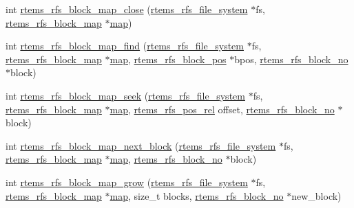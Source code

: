 \begin{DoxyCompactItemize}
\item 
int \mbox{\hyperlink{rtems-rfs-block_8c_a9f3eaf881c5744fcfe5798cea33999a7}{rtems\+\_\+rfs\+\_\+block\+\_\+map\+\_\+close}} (\mbox{\hyperlink{struct__rtems__rfs__file__system}{rtems\+\_\+rfs\+\_\+file\+\_\+system}} $\ast$fs, \mbox{\hyperlink{rtems-rfs-block_8h_af488270acef452a961e888bffdc3a7bf}{rtems\+\_\+rfs\+\_\+block\+\_\+map}} $\ast$\mbox{\hyperlink{struct__map}{map}})
\item 
int \mbox{\hyperlink{rtems-rfs-block_8c_a425d37b16d533475f1c60069eedfa6aa}{rtems\+\_\+rfs\+\_\+block\+\_\+map\+\_\+find}} (\mbox{\hyperlink{struct__rtems__rfs__file__system}{rtems\+\_\+rfs\+\_\+file\+\_\+system}} $\ast$fs, \mbox{\hyperlink{rtems-rfs-block_8h_af488270acef452a961e888bffdc3a7bf}{rtems\+\_\+rfs\+\_\+block\+\_\+map}} $\ast$\mbox{\hyperlink{struct__map}{map}}, \mbox{\hyperlink{rtems-rfs-block-pos_8h_a0d8bd7482333e584a03df45e60cda226}{rtems\+\_\+rfs\+\_\+block\+\_\+pos}} $\ast$bpos, \mbox{\hyperlink{rtems-rfs-block-pos_8h_abbf8bb95acf9bd16ed3291f7da518e9a}{rtems\+\_\+rfs\+\_\+block\+\_\+no}} $\ast$block)
\item 
int \mbox{\hyperlink{rtems-rfs-block_8c_a0bb73241f191cf0f14dee8c309e8d577}{rtems\+\_\+rfs\+\_\+block\+\_\+map\+\_\+seek}} (\mbox{\hyperlink{struct__rtems__rfs__file__system}{rtems\+\_\+rfs\+\_\+file\+\_\+system}} $\ast$fs, \mbox{\hyperlink{rtems-rfs-block_8h_af488270acef452a961e888bffdc3a7bf}{rtems\+\_\+rfs\+\_\+block\+\_\+map}} $\ast$\mbox{\hyperlink{struct__map}{map}}, \mbox{\hyperlink{rtems-rfs-file-system_8h_af6bccb465dcd34c68e9f0c214950ef57}{rtems\+\_\+rfs\+\_\+pos\+\_\+rel}} offset, \mbox{\hyperlink{rtems-rfs-block-pos_8h_abbf8bb95acf9bd16ed3291f7da518e9a}{rtems\+\_\+rfs\+\_\+block\+\_\+no}} $\ast$block)
\item 
int \mbox{\hyperlink{rtems-rfs-block_8c_af76c5594aa8b24cb57000a1a9de72c2d}{rtems\+\_\+rfs\+\_\+block\+\_\+map\+\_\+next\+\_\+block}} (\mbox{\hyperlink{struct__rtems__rfs__file__system}{rtems\+\_\+rfs\+\_\+file\+\_\+system}} $\ast$fs, \mbox{\hyperlink{rtems-rfs-block_8h_af488270acef452a961e888bffdc3a7bf}{rtems\+\_\+rfs\+\_\+block\+\_\+map}} $\ast$\mbox{\hyperlink{struct__map}{map}}, \mbox{\hyperlink{rtems-rfs-block-pos_8h_abbf8bb95acf9bd16ed3291f7da518e9a}{rtems\+\_\+rfs\+\_\+block\+\_\+no}} $\ast$block)
\item 
int \mbox{\hyperlink{rtems-rfs-block_8c_aa0041e23dc7269c746a5d198fda8426d}{rtems\+\_\+rfs\+\_\+block\+\_\+map\+\_\+grow}} (\mbox{\hyperlink{struct__rtems__rfs__file__system}{rtems\+\_\+rfs\+\_\+file\+\_\+system}} $\ast$fs, \mbox{\hyperlink{rtems-rfs-block_8h_af488270acef452a961e888bffdc3a7bf}{rtems\+\_\+rfs\+\_\+block\+\_\+map}} $\ast$\mbox{\hyperlink{struct__map}{map}}, size\+\_\+t blocks, \mbox{\hyperlink{rtems-rfs-block-pos_8h_abbf8bb95acf9bd16ed3291f7da518e9a}{rtems\+\_\+rfs\+\_\+block\+\_\+no}} $\ast$new\+\_\+block)

\end{DoxyCompactItemize}
